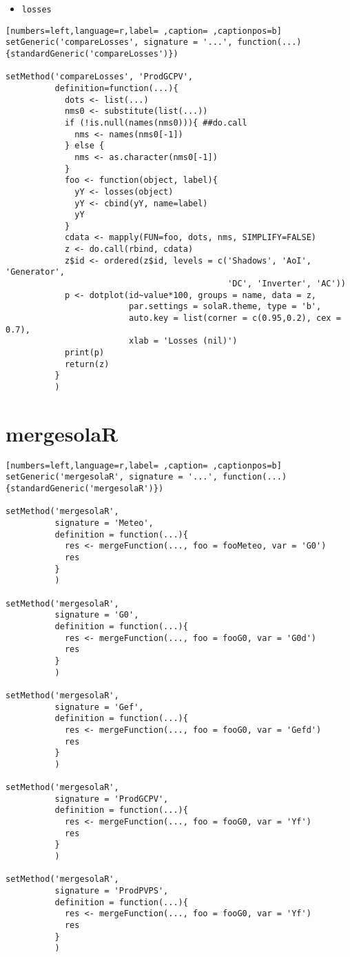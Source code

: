 \begin{itemize}
\item \texttt{losses}
\end{itemize}
\begin{lstlisting}[numbers=left,language=r,label= ,caption= ,captionpos=b]
setGeneric('compareLosses', signature = '...', function(...){standardGeneric('compareLosses')})

setMethod('compareLosses', 'ProdGCPV',
          definition=function(...){
            dots <- list(...)
            nms0 <- substitute(list(...))
            if (!is.null(names(nms0))){ ##do.call
              nms <- names(nms0[-1])
            } else {
              nms <- as.character(nms0[-1])
            }
            foo <- function(object, label){
              yY <- losses(object)
              yY <- cbind(yY, name=label)
              yY
            }
            cdata <- mapply(FUN=foo, dots, nms, SIMPLIFY=FALSE)
            z <- do.call(rbind, cdata)
            z$id <- ordered(z$id, levels = c('Shadows', 'AoI', 'Generator',
                                             'DC', 'Inverter', 'AC'))
            p <- dotplot(id~value*100, groups = name, data = z,
                         par.settings = solaR.theme, type = 'b',
                         auto.key = list(corner = c(0.95,0.2), cex = 0.7),
                         xlab = 'Losses (nil)')
            print(p)
            return(z)
          }
          )
\end{lstlisting}
\section{mergesolaR}
\label{sec:orgd0c60ee}
\begin{lstlisting}[numbers=left,language=r,label= ,caption= ,captionpos=b]
setGeneric('mergesolaR', signature = '...', function(...){standardGeneric('mergesolaR')})

setMethod('mergesolaR',
          signature = 'Meteo',
          definition = function(...){
            res <- mergeFunction(..., foo = fooMeteo, var = 'G0')
            res
          }
          )

setMethod('mergesolaR',
          signature = 'G0',
          definition = function(...){
            res <- mergeFunction(..., foo = fooG0, var = 'G0d')
            res
          }
          )

setMethod('mergesolaR',
          signature = 'Gef',
          definition = function(...){
            res <- mergeFunction(..., foo = fooG0, var = 'Gefd')
            res
          }
          )

setMethod('mergesolaR',
          signature = 'ProdGCPV',
          definition = function(...){
            res <- mergeFunction(..., foo = fooG0, var = 'Yf')
            res
          }
          )

setMethod('mergesolaR',
          signature = 'ProdPVPS',
          definition = function(...){
            res <- mergeFunction(..., foo = fooG0, var = 'Yf')
            res
          }
          )
\end{lstlisting}
